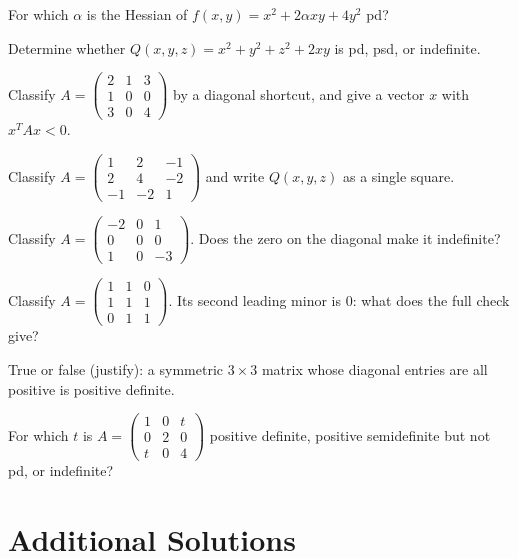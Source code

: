 \begin{problems}
    \item For which $\alpha$ is the Hessian of $f(x, y) = x^{2} + 2 \alpha x y + 4 y^{2}$ pd?
    \item Determine whether $Q(x, y, z) = x^{2} + y^{2} + z^{2} + 2 x y$ is pd, psd, or indefinite.
    \item Classify $A = \begin{pmatrix} 2 & 1 & 3 \\ 1 & 0 & 0 \\ 3 & 0 & 4 \end{pmatrix}$ by a diagonal shortcut, and give a vector $x$ with $x^{T} A x < 0$.
    \item Classify $A = \begin{pmatrix} 1 & 2 & -1 \\ 2 & 4 & -2 \\ -1 & -2 & 1 \end{pmatrix}$ and write $Q(x, y, z)$ as a single square.
    \item Classify $A = \begin{pmatrix} -2 & 0 & 1 \\ 0 & 0 & 0 \\ 1 & 0 & -3 \end{pmatrix}$. Does the zero on the diagonal make it indefinite?
    \item Classify $A = \begin{pmatrix} 1 & 1 & 0 \\ 1 & 1 & 1 \\ 0 & 1 & 1 \end{pmatrix}$. Its second leading minor is $0$: what does the full check give?
    \item True or false (justify): a symmetric $3 \times 3$ matrix whose diagonal entries are all positive is positive definite.
    \item For which $t$ is $A = \begin{pmatrix} 1 & 0 & t \\ 0 & 2 & 0 \\ t & 0 & 4 \end{pmatrix}$ positive definite, positive semidefinite but not pd, or indefinite?
\end{problems}

\section{Additional Solutions}

